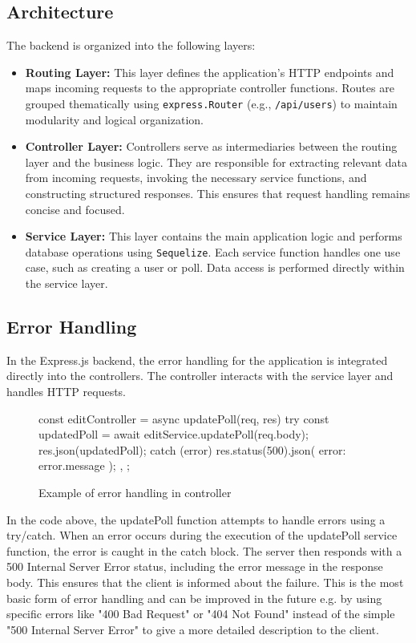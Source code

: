 \documentclass[a4paper,12pt]{report}
\begin{document}
\subsection{Architecture}
The backend is organized into the following layers:
\begin{itemize}
	\item \textbf{Routing Layer:} This layer defines the application's HTTP endpoints and maps incoming requests to the appropriate controller functions. Routes are grouped thematically using \verb|express.Router| (e.g., \verb|/api/users|) to maintain modularity and logical organization.
	
	\item \textbf{Controller Layer:} Controllers serve as intermediaries between the routing layer and the business logic. They are responsible for extracting relevant data from incoming requests, invoking the necessary service functions, and constructing structured responses. This ensures that request handling remains concise and focused.
	
	\item \textbf{Service Layer:} This layer contains the main application logic and performs database operations using \texttt{Sequelize}. Each service function handles one use case, such as creating a user or poll. Data access is performed directly within the service layer.
\end{itemize}
\subsection{Error Handling}
In the Express.js backend, the error handling for the application is integrated directly into the controllers. The controller interacts with the service layer and handles HTTP requests. 
\begin{figure}[H]
	\begin{code}
		const editController = {
			async updatePoll(req, res) {
				try {
					const updatedPoll = await editService.updatePoll(req.body);
					res.json(updatedPoll);
				} catch (error) {
					res.status(500).json({ error: error.message });
				}
			},
		};
	\end{code}
	\caption{Example of error handling in controller}
	\label{fig:controller-err}
\end{figure}
\noindent
In the code above, the updatePoll function attempts to handle errors using a try/catch. When an error occurs during the execution of the updatePoll service function, the error is caught in the catch block. The server then responds with a 500 Internal Server Error status, including the error message in the response body. This ensures that the client is informed about the failure. This is the most basic form of error handling and can be improved in the future e.g. by using specific errors like "400 Bad Request" or "404 Not Found" instead of the simple "500 Internal Server Error" to give a more detailed description to the client. 
\end{document}
